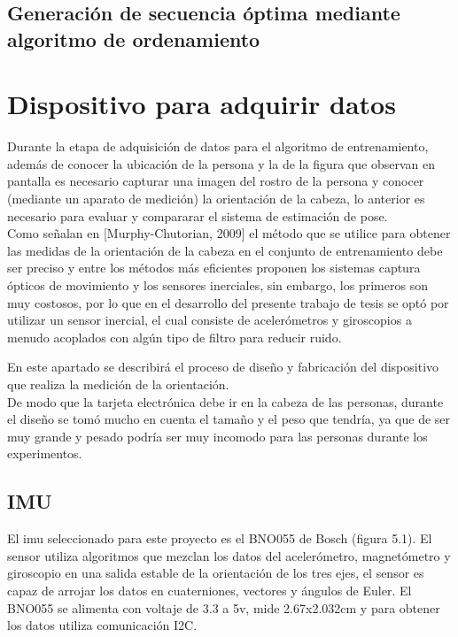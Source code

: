 	 
	 \subsection{Generación de secuencia óptima mediante algoritmo de ordenamiento}

      
        \section{Dispositivo para adquirir datos}
        Durante la etapa de adquisición de datos para el algoritmo de entrenamiento, además de conocer la ubicación de la persona y la de la figura que observan en pantalla es necesario capturar una imagen del rostro de la persona y conocer (mediante un aparato de medición) la orientación de la cabeza, lo anterior es necesario para evaluar y compararar el sistema de estimación de pose. \\
        Como señalan en [Murphy-Chutorian, 2009] el método que se utilice para obtener las medidas de la orientación de la cabeza en el conjunto de entrenamiento debe ser preciso y entre los métodos más eficientes proponen los sistemas captura ópticos de movimiento y los sensores inerciales, sin embargo, los primeros son muy costosos, por lo que en el desarrollo del presente trabajo de tesis se optó por utilizar un sensor inercial, el cual consiste de acelerómetros y giroscopios a menudo acoplados con algún tipo de filtro para reducir ruido.
        
        En este apartado se describirá el proceso de diseño y fabricación del dispositivo que realiza la medición de la orientación.\\
        De modo que la tarjeta electrónica debe ir en la cabeza de las personas, durante el diseño se tomó mucho en cuenta el tamaño y el peso que tendría, ya que de ser muy grande y  pesado podría ser muy incomodo para las personas durante los experimentos. 
        \subsection{IMU}
        El imu seleccionado para este proyecto es el BNO055 de Bosch (figura 5.1). El sensor utiliza algoritmos que mezclan los datos del acelerómetro, magnetómetro y giroscopio en una salida estable de la orientación de los tres ejes, el sensor es capaz de arrojar los datos en cuaterniones, vectores y ángulos de Euler. El BNO055 se alimenta con voltaje de 3.3 a 5v, mide 2.67x2.032cm y para obtener los datos utiliza comunicación I2C.
        
